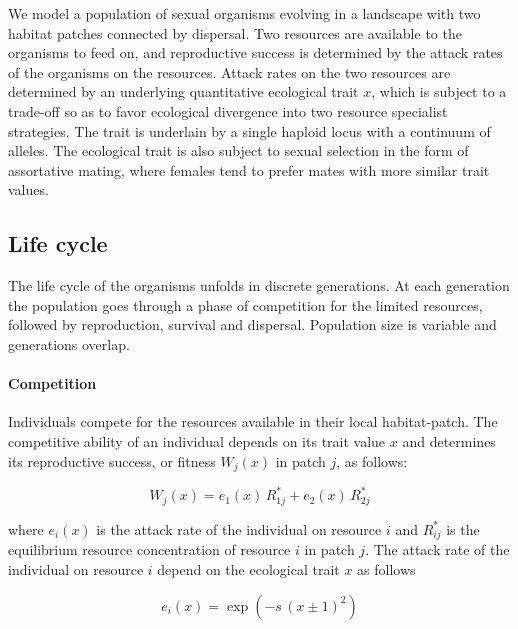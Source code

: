 We model a population of sexual organisms evolving in a landscape with two habitat patches connected by dispersal. Two resources are available to the organisms to feed on, and reproductive success is determined by the attack rates of the organisms on the resources. Attack rates on the two resources are determined by an underlying quantitative ecological trait $x$, which is subject to a trade-off so as to favor ecological divergence into two resource specialist strategies. The trait is underlain by a single haploid locus with a continuum of alleles. The ecological trait is also subject to sexual selection in the form of assortative mating, where females tend to prefer mates with more similar trait values.

\subsection*{Life cycle}

The life cycle of the organisms unfolds in discrete generations. At each generation the population goes through a phase of competition for the limited resources, followed by reproduction, survival and dispersal. Population size is variable and generations overlap.

\paragraph{Competition} Individuals compete for the resources available in their local habitat-patch. The competitive ability of an individual depends on its trait value $x$ and determines its reproductive success, or fitness $W_j(x)$ in patch $j$, as follows:

\begin{equation}
    W_j(x) = e_1(x) \, R^*_{1j} + e_2(x) \, R^*_{2j}
    \label{W_j}
\end{equation}

where $e_i(x)$ is the attack rate of the individual on resource $i$ and $R^*_{ij}$ is the equilibrium resource concentration of resource $i$ in patch $j$. The attack rate of the individual on resource $i$ depend on the ecological trait $x$ as follows

\begin{equation}
    e_i(x) = \exp{(-s \, (x \pm 1)^2)}
    \label{eq:attack_rates}
\end{equation}

